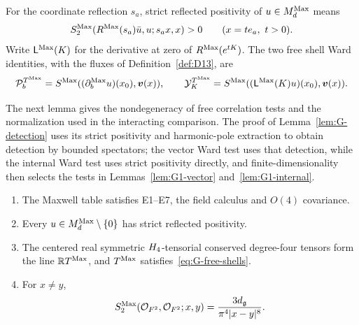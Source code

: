 For the coordinate reflection $s_a$, strict reflected positivity of $u\in M_{d}^{\mathrm{Max}}$ means
\begin{equation*}
S^{\mathrm{Max}}_2(R^{\rm Max}(s_a)\bar u,u;s_ax,x)>0
\qquad(x=te_a,\ t>0).
\end{equation*}
Write $\mathsf L^{\rm Max}(K)$ for the derivative at zero of $R^{\rm Max}(e^{tK})$. The two free shell Ward identities, with the fluxes of Definition~\ref{def:D13}, are
\begin{equation}\label{eq:G-free-shells}
\mathcal P_b^{T^{\rm Max}}=S^{\rm Max}((\partial_b^{\rm Max}u)(x_0),\boldsymbol v(x)),\qquad
\mathcal Y_K^{T^{\rm Max}}=S^{\rm Max}((\mathsf L^{\rm Max}(K)u)(x_0),\boldsymbol v(x)).
\end{equation}

The next lemma gives the nondegeneracy of free correlation tests and the normalization used in the interacting comparison. The proof of Lemma~\ref{lem:G-detection} uses its strict positivity and harmonic-pole extraction to obtain detection by bounded spectators; the vector Ward test uses that detection, while the internal Ward test uses strict positivity directly, and finite-dimensionality then selects the tests in Lemmas~\ref{lem:G1-vector} and~\ref{lem:G1-internal}.
\begin{lemma}\label{lem:G1.1}
\begin{enumerate}[label=(\roman*)]
\item The Maxwell table satisfies E1--E7, the field calculus and $O(4)$ covariance.
\item Every $u\in M_{d}^{\mathrm{Max}}\setminus\{0\}$ has strict reflected positivity.
\item The centered real symmetric $H_4$-tensorial conserved degree-four tensors form the line $\mathbb{R}T^{\mathrm{Max}}$, and $T^{\mathrm{Max}}$ satisfies~\eqref{eq:G-free-shells}.
\item For $x\ne y$,
\begin{equation*}
S^{\mathrm{Max}}_2(\mathcal{O}_{F^2},\mathcal{O}_{F^2};x,y)
=\frac{3d_{\mathfrak{g}}}{\pi^4|x-y|^8}.
\end{equation*}
\end{enumerate}
\end{lemma}
